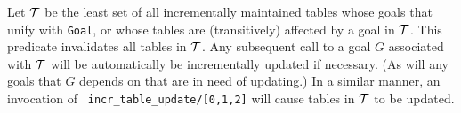 \begin{description}


%

Let ${\cal T}$ be the least set of all incrementally maintained tables
whose goals that unify with {\tt Goal}, or whose tables are
(transitively) affected by a goal in ${\cal T}$.  This predicate invalidates
all tables in ${\cal T}$.  Any subsequent call to a goal $G$ associated
with ${\cal T}$ will be automatically be incrementally updated if
necessary.  (As will any goals that $G$ depends on that are in need of
updating.)  In a similar manner, an invocation of {\tt
  incr\_table\_update/[0,1,2]} will cause tables in ${\cal T}$ to be
updated.


\end{description}
